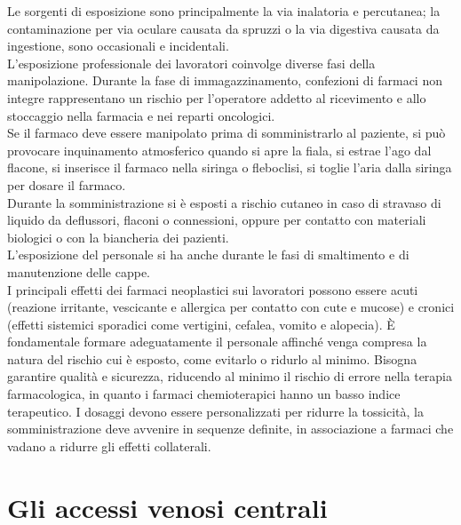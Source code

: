 Le sorgenti di esposizione sono principalmente la via inalatoria e percutanea; la contaminazione per via oculare 
causata da spruzzi o la via digestiva causata da ingestione, sono occasionali e incidentali\cite{FNOPI}.\\ 
L'esposizione professionale dei lavoratori coinvolge diverse fasi della manipolazione. Durante la fase di 
immagazzinamento, confezioni di farmaci non integre rappresentano un rischio per l'operatore addetto al ricevimento e 
allo stoccaggio nella farmacia e nei reparti oncologici.\\ Se il farmaco deve essere manipolato prima di somministrarlo 
al paziente, si può provocare inquinamento atmosferico quando si apre la fiala, si estrae l'ago dal flacone, 
si inserisce il farmaco nella siringa o fleboclisi, si toglie l'aria dalla siringa per dosare il farmaco\cite{FNOPI}.\\ 
Durante la somministrazione si è esposti a rischio cutaneo in caso di stravaso di liquido da deflussori, flaconi o 
connessioni, oppure per contatto con materiali biologici o con la biancheria dei pazienti.\\ 
L'esposizione del personale si ha anche durante le fasi di smaltimento e di manutenzione delle cappe\cite{FNOPI}.\\
I principali effetti dei farmaci neoplastici sui lavoratori possono essere acuti (reazione irritante, vescicante e 
allergica per contatto con cute e mucose) e cronici (effetti sistemici sporadici come vertigini, cefalea, vomito e 
alopecia). È fondamentale formare adeguatamente il personale affinché venga compresa la natura del rischio cui è esposto, 
come evitarlo o ridurlo al minimo. Bisogna garantire qualità e sicurezza, riducendo al minimo il rischio di errore 
nella terapia farmacologica, in quanto i farmaci chemioterapici hanno un basso indice terapeutico. I dosaggi devono 
essere personalizzati per ridurre la tossicità, la somministrazione deve avvenire in sequenze definite, 
in associazione a farmaci che vadano a ridurre gli effetti collaterali\cite{ISSESPO}.

\section{Gli accessi venosi centrali}


